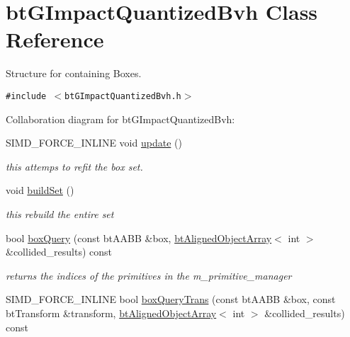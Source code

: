 \hypertarget{classbt_g_impact_quantized_bvh}{
\section{btGImpactQuantizedBvh Class Reference}
\label{classbt_g_impact_quantized_bvh}
}
Structure for containing Boxes.  


{\tt \#include $<$btGImpactQuantizedBvh.h$>$}

Collaboration diagram for btGImpactQuantizedBvh:\begin{CompactItemize}
\item 
SIMD\_\-FORCE\_\-INLINE void \hyperlink{classbt_g_impact_quantized_bvh_71665f5245b8f7de1c54f107ef262cd0}{update} ()
\begin{CompactList}\small\item\em this attemps to refit the box set. \item\end{CompactList}\item 
\hypertarget{classbt_g_impact_quantized_bvh_2f061fbf0c6d8a81438861be4add7968}{
void \hyperlink{classbt_g_impact_quantized_bvh_2f061fbf0c6d8a81438861be4add7968}{buildSet} ()}
\label{classbt_g_impact_quantized_bvh_2f061fbf0c6d8a81438861be4add7968}

\begin{CompactList}\small\item\em this rebuild the entire set \item\end{CompactList}\item 
\hypertarget{classbt_g_impact_quantized_bvh_b265ffaec21d729bb4d148e843de938c}{
bool \hyperlink{classbt_g_impact_quantized_bvh_b265ffaec21d729bb4d148e843de938c}{boxQuery} (const btAABB \&box, \hyperlink{classbt_aligned_object_array}{btAlignedObjectArray}$<$ int $>$ \&collided\_\-results) const }
\label{classbt_g_impact_quantized_bvh_b265ffaec21d729bb4d148e843de938c}

\begin{CompactList}\small\item\em returns the indices of the primitives in the m\_\-primitive\_\-manager \item\end{CompactList}\item 
\hypertarget{classbt_g_impact_quantized_bvh_7ba1ab66201f211706f1605581a004a4}{
SIMD\_\-FORCE\_\-INLINE bool \hyperlink{classbt_g_impact_quantized_bvh_7ba1ab66201f211706f1605581a004a4}{boxQueryTrans} (const btAABB \&box, const btTransform \&transform, \hyperlink{classbt_aligned_object_array}{btAlignedObjectArray}$<$ int $>$ \&collided\_\-results) const }
\label{classbt_g_impact_quantized_bvh_7ba1ab66201f211706f1605581a004a4}


\end{CompactItemize}
